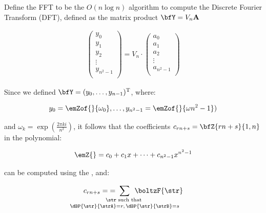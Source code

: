 \documentclass{beamer}
\begin{document}
\begin{frame}
  \begin{definition}
  Define the FFT to be the $O(n \log n)$
  algorithm to compute the Discrete Fourier Transform (DFT), defined
  as the matrix product $\bfY = V_{n} {\bf A}$
  \end{definition}

  \begin{align*}
  \left(
  \begin{array}{l}
  y_0 \\
  y_1 \\
  y_2 \\
  \vdots \\
  y_{n^2-1} \\
  \end{array}
  \right)
  = V_n \cdot
  \left(
  \begin{array}{l}
  a_0 \\
  a_1 \\
  a_2 \\
  \vdots \\
  a_{n^2-1} \\
  \end{array}
  \right)
  \end{align*}
\end{frame}

\begin{frame}
  Since we defined $\bfY =
  (y_0,\dots,y_{n-1})^{\text T}$, where:

  \begin{align*}
  y_0=\emZof{}{\omega_0},\dots,y_{n^2-1}=\emZof{}{\omega{n^2-1}})
  \end{align*}

  and $\omega_k = \exp(\frac{2\pi ki}{n^2})$, it follows that the coefficients
  $c_{rn+s}=\bfZ{rn+s}{1,n}$ in the polynomial:

  \begin{align*}
  \emZ{} = c_0 + c_1 x + \dots + c_{n^2-1} x^{n^2-1}
  \end{align*}

   can be computed using the \fft, and:

  \begin{align*}
    c_{rn+s}=\;=\;
    \sum_{\mathclap{\substack{
    \str \text{ such that } \rule[-.5ex]{0pt}{0pt} \\
    \dBP{\str}{\strA} = r,\,\dBP{\str}{\strB} = s}}}\enspace
    \boltzF{\str}
  \end{align*}
\end{frame}
\end{document}
